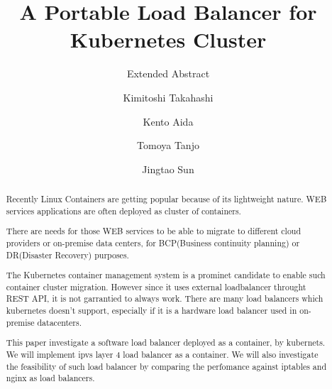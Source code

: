 \documentclass[sigconf]{acmart}
\begin{document}
\title{A Portable Load Balancer for Kubernetes Cluster}
\subtitle{Extended Abstract}


\author{Kimitoshi Takahashi}

\author{Kento Aida}

\author{Tomoya Tanjo}

\author{Jingtao Sun}

\renewcommand{\shortauthors}{B. Trovato et al.}


\begin{abstract}
Recently Linux Containers are getting popular because of its lightweight nature.
WEB services applications are often deployed as cluster of containers.

There are needs for those WEB services to be able to migrate to different cloud providers
or on-premise data centers, for BCP(Business continuity planning) or DR(Disaster Recovery) purposes.

The Kubernetes container management system is a prominet candidate to enable such container cluster migration.
However since it uses external loadbalancer throught REST API,
it is not garrantied to always work.
There are many load balancers which  kubernetes doesn't support, 
especially if it is a hardware load balancer used in on-premise datacenters.

This paper investigate a software load balancer deployed as a container, by kubernets. 
We will implement ipvs layer 4 load balancer as a container.
We will also investigate the feasibility of such load balancer by comparing the perfomance against iptables and nginx as load balancers.

\end{abstract}
\end{document}
